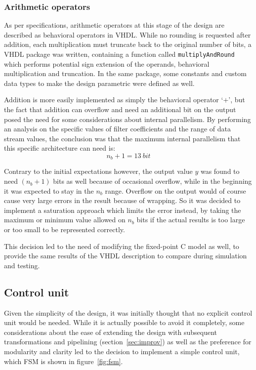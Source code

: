 \documentclass[a4paper]{article}
\begin{document}
\subsubsection{Arithmetic operators}
As per specifications, arithmetic operators at this stage of the design are described as behavioral operators in VHDL. While no rounding is requested after addition, each multiplication must truncate back to the original number of bits, a VHDL package was written, containing a function called \texttt{multiplyAndRound} which performs potential sign extension of the operands, behavioral multiplication and truncation. In the same package, some constants and custom data types to make the design parametric were defined as well.

Addition is more easily implemented as simply the behavioral operator `$+$', but the fact that addition can overflow and need an additional bit on the output posed the need for some considerations about internal parallelism. By performing an analysis on the specific values of filter coefficients and the range of data stream values, the conclusion was that the maximum internal parallelism that this specific architecture can need is: $$n_b+1 = \SI{13}{bit}$$

Contrary to the initial expectations however, the output value $y$ was found to need $(n_b+1)$ bits as well because of occasional overflow, while in the beginning it was expected to stay in the $n_b$ range. Overflow on the output would of course cause very large errors in the result because of wrapping. So it was decided to implement a saturation approach which limits the error instead, by taking the maximum or minimum value allowed on $n_b$ bits if the actual results is too large or too small to be represented correctly.

This decision led to the need of modifying the fixed-point C model as well, to provide the same results of the VHDL description to compare during simulation and testing.

\subsection{Control unit}
Given the simplicity of the design, it was initially thought that no explicit control unit would be needed. While it is actually possible to avoid it completely, some considerations about the ease of extending the design with subsequent transformations and pipelining (section~\ref{sec:improv}) as well as the preference for modularity and clarity led to the decision to implement a simple control unit, which FSM is shown in figure~\ref{fig:fsm}.
\end{document}
